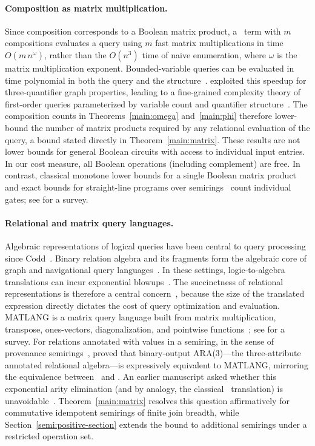 \paragraph{Composition as matrix multiplication.}
Since composition corresponds to a Boolean matrix product, a \CoR\ term with $m$
compositions evaluates a query using $m$ fast matrix multiplications in time
$O(m\,n^{\omega})$, rather than the $O(n^3)$ time of naive enumeration,
where $\omega$ is the matrix multiplication exponent. Bounded-variable queries
can be evaluated in time polynomial in both the query and the
structure~\citep{vardi1995}. \citet{Williams2014} exploited this speedup for
three-quantifier graph properties, leading to a fine-grained complexity
theory of first-order queries parameterized by variable count and quantifier
structure~\citep{GaoImpagliazzoKolokolovaWilliams2017,BringmannFischerKunnemann2019,GaoImpagliazzo2019}.
The composition counts in Theorems~\ref{main:omega} and~\ref{main:phi}
therefore lower-bound the number of matrix products required by any
relational evaluation of the query, a bound stated directly in
Theorem~\ref{main:matrix}. These results are not lower bounds for general
Boolean circuits with access to individual input entries. In our cost measure,
all Boolean operations (including complement) are free. In contrast,
classical monotone lower bounds for a single Boolean matrix
product~\citep{kerr1970,pratt1975,paterson1975,mehlhorn-galil1976} and
exact bounds for straight-line programs over semirings~\citep{jerrum-snir1982}
count individual gates; see \citet{jukna2012} for a survey.

\paragraph{Relational and matrix query languages.}
Algebraic representations of logical queries have been central to query
processing since Codd~\citep{Codd1970,Codd1972}. Binary relation algebra and its
fragments form the algebraic core of graph and navigational query
languages~\citep{FletcherEtAl2015,HellingsEtAl2021,HellingsEtAl2022}. In these
settings, logic-to-algebra translations can incur exponential
blowups~\citep{BaranyTenCateOtto2012}. The succinctness of relational
representations is therefore a central concern~\citep{FletcherEtAl2015},
because the size of the translated expression directly dictates the cost of
query optimization and evaluation. MATLANG is a matrix query language built
from matrix multiplication, transpose, ones-vectors, diagonalization, and
pointwise functions~\citep{brijder2019tods}; see \citet{geerts2021} for a
survey. For relations annotated with values in a semiring, in the sense of
provenance semirings~\citep{green2007},
\citet{brijder2022} proved that binary-output ARA(3)---the three-attribute
annotated relational algebra---is expressively equivalent to MATLANG,
mirroring the equivalence between \FOthree\ and \CoR. An earlier manuscript
asked whether this exponential arity elimination (and by analogy, the
classical \FOthree\ translation) is unavoidable~\citep[p.~9]{brijder2019}.
Theorem~\ref{main:matrix} resolves this question affirmatively for
commutative idempotent semirings of finite join breadth, while
Section~\ref{semi:positive-section} extends the bound to additional semirings
under a restricted operation set.
